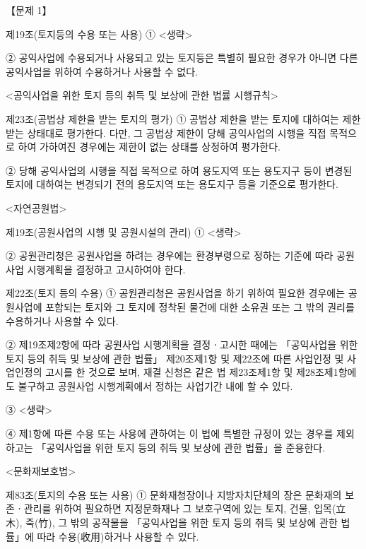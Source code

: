 \begin{longquestion}{【문제 1】}
\begin{framedtext}
제19조(토지등의 수용 또는 사용) ① <생략> \par
② 공익사업에 수용되거나 사용되고 있는 토지등은 특별히 필요한 경우가 아니면 다른 공익사업을 위하여 수용하거나 사용할 수 없다. \par
<공익사업을 위한 토지 등의 취득 및 보상에 관한 법률 시행규칙> \par
제23조(공법상 제한을 받는 토지의 평가) ① 공법상 제한을 받는 토지에 대하여는 제한받는 상태대로 평가한다. 다만, 그 공법상 제한이 당해 공익사업의 시행을 직접 목적으로 하여 가하여진 경우에는 제한이 없는 상태를 상정하여 평가한다. \par
② 당해 공익사업의 시행을 직접 목적으로 하여 용도지역 또는 용도지구 등이 변경된 토지에 대하여는 변경되기 전의 용도지역 또는 용도지구 등을 기준으로 평가한다. \par
<자연공원법> \par
제19조(공원사업의 시행 및 공원시설의 관리) ① <생략> \par
② 공원관리청은 공원사업을 하려는 경우에는 환경부령으로 정하는 기준에 따라 공원사업 시행계획을 결정하고 고시하여야 한다. \par
제22조(토지 등의 수용) ① 공원관리청은 공원사업을 하기 위하여 필요한 경우에는 공원사업에 포함되는 토지와 그 토지에 정착된 물건에 대한 소유권 또는 그 밖의 권리를 수용하거나 사용할 수 있다. \par
② 제19조제2항에 따라 공원사업 시행계획을 결정ㆍ고시한 때에는 「공익사업을 위한 토지 등의 취득 및 보상에 관한 법률」 제20조제1항 및 제22조에 따른 사업인정 및 사업인정의 고시를 한 것으로 보며, 재결 신청은 같은 법 제23조제1항 및 제28조제1항에도 불구하고 공원사업 시행계획에서 정하는 사업기간 내에 할 수 있다. \par
③ <생략> \par
④ 제1항에 따른 수용 또는 사용에 관하여는 이 법에 특별한 규정이 있는 경우를 제외하고는 「공익사업을 위한 토지 등의 취득 및 보상에 관한 법률」을 준용한다. \par
<문화재보호법> \par
제83조(토지의 수용 또는 사용) ① 문화재청장이나 지방자치단체의 장은 문화재의 보존ㆍ관리를 위하여 필요하면 지정문화재나 그 보호구역에 있는 토지, 건물, 입목(立木), 죽(竹), 그 밖의 공작물을 「공익사업을 위한 토지 등의 취득 및 보상에 관한 법률」에 따라 수용(收用)하거나 사용할 수 있다. \par
\end{framedtext}
\end{longquestion}
